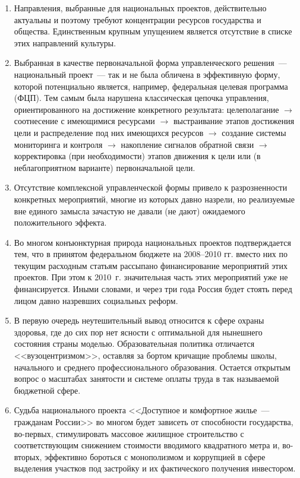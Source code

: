 \documentclass[article, 12pt, russian, oneside]{ncc}
\begin{document}
\begin{enumerate}
\item Направления, выбранные для национальных проектов, действительно
  актуальны и поэтому требуют концентрации ресурсов государства и
  общества. Единственным крупным упущением является отсутствие в
  списке этих направлений культуры.

\item Выбранная в качестве первоначальной форма управленческого
  решения~--- национальный проект~--- так и не была обличена в
  эффективную форму, которой потенциально является, например,
  федеральная целевая программа (ФЦП). Тем самым была нарушена
  классическая цепочка управления, ориентированного на достижение
  конкретного результата: целеполагание $\rightarrow$ соотнесение с
  имеющимися ресурсами $\rightarrow$ выстраивание этапов достижения
  цели и распределение под них имеющихся ресурсов $\rightarrow$
  создание системы мониторинга и контроля $\rightarrow$ накопление
  сигналов обратной связи $\rightarrow$ корректировка (при
  необходимости) этапов движения к цели или (в неблагоприятном
  варианте) первоначальной цели.

\item Отсутствие комплексной управленческой формы привело к
  разрозненности конкретных мероприятий, многие из которых давно
  назрели, но реализуемые вне единого замысла зачастую не давали (не
  дают) ожидаемого положительного эффекта.

\item Во многом конъюнктурная природа национальных проектов
  подтверждается тем, что в принятом федеральном бюджете на 2008--2010
  гг. вместо них по текущим расходным статьям рассыпано финансирование
  мероприятий этих проектов. При этом к 2010~г. значительная часть
  этих мероприятий уже не финансируется. Иными словами, и через три
  года Россия будет стоять перед лицом давно назревших социальных
  реформ.

\item В первую очередь неутешительный вывод относится к сфере охраны
  здоровья, где до сих пор нет ясности с оптимальной для нынешнего
  состояния страны моделью. Образовательная политика отличается
  <<вузоцентризмом>>, оставляя за бортом кричащие проблемы школы,
  начального и среднего профессионального образования. Остается
  открытым вопрос о масштабах занятости и системе оплаты труда в так
  называемой бюджетной сфере.

\item Судьба национального проекта <<Доступное и комфортное жилье~---
  гражданам России>> во многом будет зависеть от способности
  государства, во-первых, стимулировать массовое жилищное
  строительство с соответствующим снижением стоимости вводимого
  квадратного метра и, во-вторых, эффективно бороться с монополизмом и
  коррупцией в сфере выделения участков под застройку и их
  фактического получения инвестором.


\end{enumerate}
\end{document}
